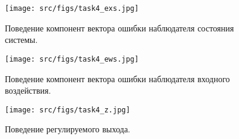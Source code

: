   \begin{figure}[ht!]
    \centering
    \texttt{[image: src/figs/task4\_exs.jpg]}
    \caption{Поведение компонент вектора ошибки наблюдателя состояния системы.}
    \label{fig:task4_exs}
  \end{figure} 
  \begin{figure}[ht!]
    \centering
    \texttt{[image: src/figs/task4\_ews.jpg]}
    \caption{Поведение компонент вектора ошибки наблюдателя входного воздействия.}
    \label{fig:task4_ews}
  \end{figure} 

  \begin{figure}[ht!]
    \centering
    \texttt{[image: src/figs/task4\_z.jpg]}
    \caption{Поведение регулируемого выхода.}
    \label{fig:task4_z}
  \end{figure} 